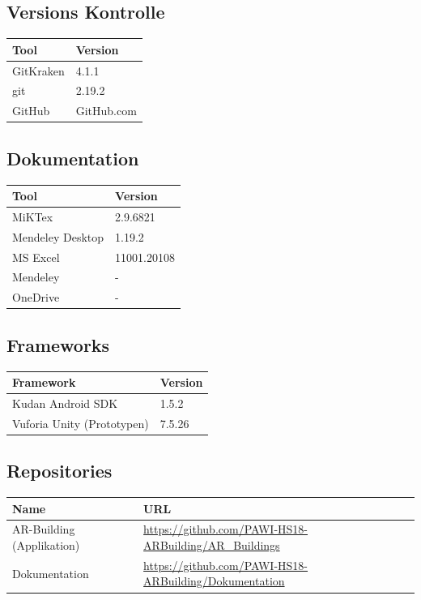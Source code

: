 \documentclass[a4paper]{scrreprt}
\begin{document}
\subsection{Versions Kontrolle}
\begin{table}[h!]
	\begin{tabular}{p{} p{}}
		\hline
		\textbf{Tool} & \textbf{Version} \\
		\hline
		GitKraken & 4.1.1 \\
		\hline
		git & 2.19.2 \\
		\hline
		GitHub & GitHub.com \\
		\hline
	\end{tabular}
\end{table}

\clearpage
\subsection{Dokumentation}
\begin{table}[h!]
	\begin{tabular}{p{} p{}}
		\hline
		\textbf{Tool} & \textbf{Version} \\
		\hline
		MiKTex & 2.9.6821 \\
		\hline
		Mendeley Desktop & 1.19.2 \\
		\hline
		MS Excel & 11001.20108 \\
		\hline
		Mendeley & - \\
		\hline
		OneDrive & - \\
		\hline
	\end{tabular}
\end{table}

\subsection{Frameworks}
\begin{table}[h!]
	\begin{tabular}{p{} p{}}
		\hline
		\textbf{Framework} & \textbf{Version} \\
		\hline
		Kudan Android SDK & 1.5.2 \\
		\hline
		Vuforia Unity (Prototypen) & 7.5.26 \\
		\hline
	\end{tabular}
\end{table}



\subsection{Repositories}
\begin{table}[h!]
	\begin{tabular}{p{} p{}}
		\hline
		\textbf{Name} & \textbf{URL} \\
		\hline
		AR-Building (Applikation) & \url{https://github.com/PAWI-HS18-ARBuilding/AR_Buildings} \\
		\hline
		Dokumentation & \url{https://github.com/PAWI-HS18-ARBuilding/Dokumentation} \\
		\hline
	\end{tabular}
\end{table}
\end{document}
